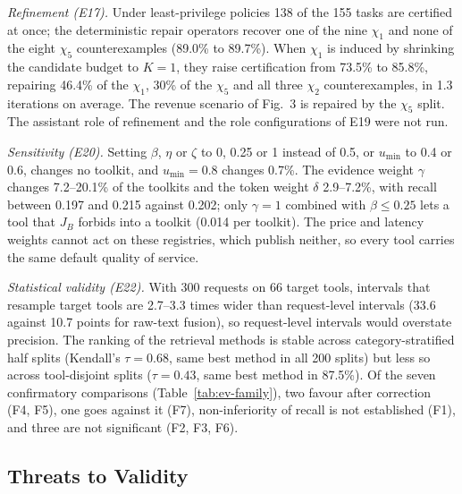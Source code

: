 \emph{Refinement (E17).} Under least-privilege policies 138 of the 155 tasks are certified at once; the
deterministic repair operators recover one of the nine $\chi_1$ and none of the eight $\chi_5$ counterexamples
(89.0\% to 89.7\%). When $\chi_1$ is induced by shrinking the candidate budget to $K=1$, they raise certification
from 73.5\% to 85.8\%, repairing 46.4\% of the $\chi_1$, 30\% of the $\chi_5$ and all three $\chi_2$
counterexamples, in 1.3 iterations on average. The revenue scenario of Fig.~3 is repaired by the $\chi_5$ split. The
assistant role of refinement and the role configurations of E19 were not run.

\emph{Sensitivity (E20).} Setting $\beta$, $\eta$ or $\zeta$ to 0, 0.25 or 1 instead of 0.5, or $u_{\min}$ to 0.4 or
0.6, changes no toolkit, and $u_{\min}=0.8$ changes 0.7\%. The evidence weight $\gamma$ changes 7.2--20.1\% of the
toolkits and the token weight $\delta$ 2.9--7.2\%, with recall between 0.197 and 0.215 against 0.202; only
$\gamma=1$ combined with $\beta\le0.25$ lets a tool that $J_B$ forbids into a toolkit (0.014 per toolkit). The
price and latency weights cannot act on these registries, which publish neither, so every tool carries the same
default quality of service.



\emph{Statistical validity (E22).} With 300 requests on 66 target tools, intervals that resample target tools are
2.7--3.3 times wider than request-level intervals (33.6 against 10.7 points for raw-text fusion), so
request-level intervals would overstate precision. The ranking of the retrieval methods is stable across
category-stratified half splits (Kendall's $\tau=0.68$, same best method in all 200 splits) but less so across
tool-disjoint splits ($\tau=0.43$, same best method in 87.5\%). Of the seven confirmatory comparisons
(Table~\ref{tab:ev-family}), two favour \pamcp{} after correction (F4, F5), one goes against it (F7), non-inferiority
of recall is not established (F1), and three are not significant (F2, F3, F6).

\subsection{Threats to Validity}
\label{sec:ev-threats}

